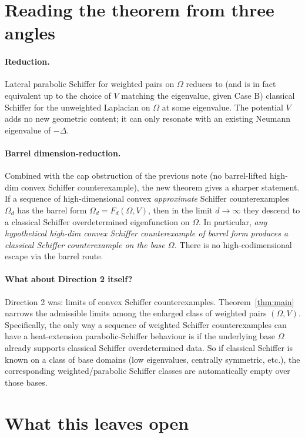 \documentclass[11pt]{article}
\newcommand{\Om}{\Omega}
\newcommand{\1}{\mathbf 1}
\begin{document}
\section{Reading the theorem from three angles}

\paragraph{Reduction.} Lateral parabolic Schiffer for weighted pairs
on $\Om$ reduces to (and is in fact equivalent up to the choice of
$V$ matching the eigenvalue, given Case B) classical Schiffer for the
unweighted Laplacian on $\Om$ at some eigenvalue. The potential $V$
adds no new geometric content; it can only resonate with an existing
Neumann eigenvalue of $-\Delta$.

\paragraph{Barrel dimension-reduction.} Combined with the cap
obstruction of the previous note (no barrel-lifted high-dim convex
Schiffer counterexample), the new theorem gives a sharper statement.
If a sequence of high-dimensional convex \emph{approximate} Schiffer
counterexamples $\Om_d$ has the barrel form $\Om_d=F_d(\Om,V)$, then
in the limit $d\to\infty$ they descend to a classical Schiffer
overdetermined eigenfunction on $\Om$. In particular, \emph{any
hypothetical high-dim convex Schiffer counterexample of barrel form
produces a classical Schiffer counterexample on the base $\Om$.}
There is no high-codimensional escape via the barrel route.

\paragraph{What about Direction 2 itself?} Direction 2 was: limits of
convex Schiffer counterexamples. Theorem~\ref{thm:main} narrows the
admissible limits among the enlarged class of weighted pairs
$(\Om,V)$. Specifically, the only way a sequence of weighted Schiffer
counterexamples can have a heat-extension parabolic-Schiffer
behaviour is if the underlying base $\Om$ already supports classical
Schiffer overdetermined data. So if classical Schiffer is known on a
class of base domains (low eigenvalues, centrally symmetric, etc.),
the corresponding weighted/parabolic Schiffer classes are
automatically empty over those bases.

\section{What this leaves open}
\end{document}
